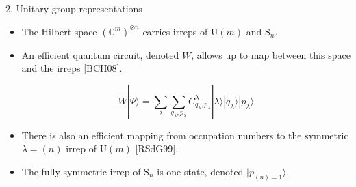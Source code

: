 \documentclass[]{templates/poster}
\begin{document}
\begin{frame}{}
\begin{columns}[t]
\begin{column}{0.422\linewidth}
  \begin{block}{\Large 2. Unitary group representations}
  \begin{itemize}
  \item The Hilbert space $(\mathbb{C}^{m})^{\otimes n}$ carries irreps of $\textrm{U}(m)$ and $\textrm{S}_n$.
  \item An efficient quantum circuit, denoted $W$, allows up to map between this space and the irreps [BCH08].
  
  $$W|\Psi\rangle = \sum_\lambda\sum_{q_{\lambda},p_{\lambda}}C^\lambda_{q_\lambda,p_\lambda}|\lambda\rangle|q_{\lambda}\rangle|p_\lambda\rangle$$
  
  \item There is also an efficient mapping from occupation numbers to the symmetric $\lambda=(n)$ irrep of $\textrm{U}(m)$ [RSdG99].
  \item The fully symmetric irrep of $\textrm{S}_n$ is one state, denoted $|p_{(n)=1}\rangle$.
  \end{itemize}
  \end{block}


\end{column}
\end{columns}
\end{frame}
\end{document}
